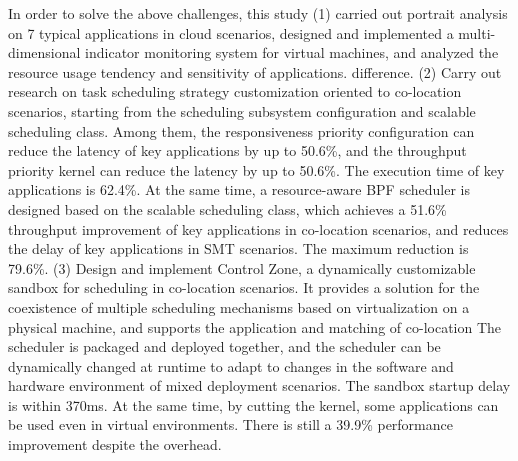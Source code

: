In order to solve the above challenges, this study (1) carried out portrait analysis on 7 typical applications in cloud scenarios, designed and implemented a multi-dimensional indicator monitoring system for virtual machines, and analyzed the resource usage tendency and sensitivity of applications. difference. (2) Carry out research on task scheduling strategy customization oriented to co-location scenarios, starting from the scheduling subsystem configuration and scalable scheduling class. Among them, the responsiveness priority configuration can reduce the latency of key applications by up to 50.6\%, and the throughput priority kernel can reduce the latency by up to 50.6\%. The execution time of key applications is 62.4\%. At the same time, a resource-aware BPF scheduler is designed based on the scalable scheduling class, which achieves a 51.6\% throughput improvement of key applications in co-location scenarios, and reduces the delay of key applications in SMT scenarios. The maximum reduction is 79.6\%. (3) Design and implement Control Zone, a dynamically customizable sandbox for scheduling in co-location scenarios. It provides a solution for the coexistence of multiple scheduling mechanisms based on virtualization on a physical machine, and supports the application and matching of co-location The scheduler is packaged and deployed together, and the scheduler can be dynamically changed at runtime to adapt to changes in the software and hardware environment of mixed deployment scenarios. The sandbox startup delay is within 370ms. At the same time, by cutting the kernel, some applications can be used even in virtual environments. There is still a 39.9\% performance improvement despite the overhead.



\pagestyle{enfrontmatterstyle}%
\cleardoublepage\pagestyle{frontmatterstyle}%


